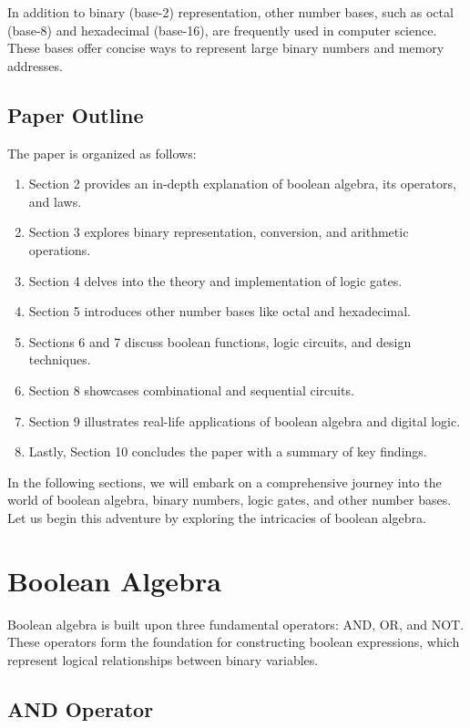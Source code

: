 \documentclass{article}
\begin{document}
In addition to binary (base-2) representation, other number bases, such as octal (base-8) and hexadecimal (base-16), are frequently used in computer science. These bases offer concise ways to represent large binary numbers and memory addresses.

\subsection{Paper Outline}

The paper is organized as follows:

\begin{enumerate}
  \item Section 2 provides an in-depth explanation of boolean algebra, its operators, and laws.
  \item Section 3 explores binary representation, conversion, and arithmetic operations.
  \item Section 4 delves into the theory and implementation of logic gates.
  \item Section 5 introduces other number bases like octal and hexadecimal.
  \item Sections 6 and 7 discuss boolean functions, logic circuits, and design techniques.
  \item Section 8 showcases combinational and sequential circuits.
  \item Section 9 illustrates real-life applications of boolean algebra and digital logic.
  \item Lastly, Section 10 concludes the paper with a summary of key findings.
\end{enumerate}

In the following sections, we will embark on a comprehensive journey into the world of boolean algebra, binary numbers, logic gates, and other number bases. Let us begin this adventure by exploring the intricacies of boolean algebra.

\newpage

\section{Boolean Algebra}

Boolean algebra is built upon three fundamental operators: AND, OR, and NOT. These operators form the foundation for constructing boolean expressions, which represent logical relationships between binary variables.

\subsection{AND Operator}
\end{document}
